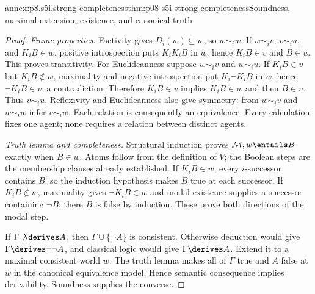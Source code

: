 \begin{annexitem}{annex:p8.s5i.strong-completeness}{thm:p08-s5i-strong-completeness}{Soundness, maximal extension, existence, and canonical truth}
\begin{proof}
\emph{Frame properties.} Factivity gives \(D_i(w)\subseteq w\),
so \(w\sim_i w\). If \(w\sim_i v\), \(v\sim_i u\), and
\(K_iB\in w\), positive introspection puts \(K_iK_iB\) in
\(w\), hence \(K_iB\in v\) and \(B\in u\). This proves
transitivity. For Euclideanness suppose \(w\sim_i v\) and
\(w\sim_i u\). If \(K_iB\in v\) but \(K_iB\notin w\),
maximality and negative introspection put \(K_i\neg K_iB\) in
\(w\), hence \(\neg K_iB\in v\), a contradiction. Therefore
\(K_iB\in v\) implies \(K_iB\in w\) and then \(B\in u\).
Thus \(v\sim_i u\). Reflexivity and Euclideanness also give symmetry:
from \(w\sim_i v\) and \(w\sim_i w\) infer \(v\sim_i w\).
Each relation is consequently an equivalence. Every calculation fixes
one agent; none requires a relation between distinct agents.

\emph{Truth lemma and completeness.} Structural induction proves
\(\mathcal M,w\entails B\) exactly when \(B\in w\).
Atoms follow from the definition of \(V\); the Boolean steps are the
membership clauses already established. If \(K_iB\in w\), every
\(i\)-successor contains \(B\), so the induction hypothesis makes
\(B\) true at each successor. If \(K_iB\notin w\), maximality
gives \(\neg K_iB\in w\) and modal existence supplies a successor
containing \(\neg B\); there \(B\) is false by induction. These
prove both directions of the modal step.

If \(\Gamma\not\derives A\), then
\(\Gamma\cup\{\neg A\}\) is consistent. Otherwise deduction
would give \(\Gamma\derives\neg\neg A\), and classical logic would
give \(\Gamma\derives A\). Extend it to a maximal consistent world
\(w\). The truth lemma makes all of \(\Gamma\) true and \(A\)
false at \(w\) in the canonical equivalence model. Hence semantic
consequence implies derivability. Soundness supplies the converse.
\end{proof}
\end{annexitem}

